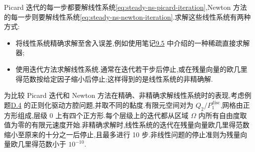 \begin{example}\label{ex:steady-ns-picard-vs-newton}
Picard 迭代的每一步都要解线性系统\cref{eq:steady-ns-picard-iteration},Newton 方法的每一步则要解线性系统\cref{eq:steady-ns-newton-iteration}.求解这些线性系统有两种方式:
\begin{itemize}
  \item 将线性系统精确求解至舍入误差,例如使用笔记\hyperref[note:ch09-sparse-direct-solvers]{9.5} 中介绍的一种稀疏直接求解器;
  \item 使用迭代方法求解线性系统.通常在迭代若干步后停止,或在残量向量的欧几里得范数按给定因子缩小后停止;这样得到的是线性系统的非精确解.
\end{itemize}

为比较 Picard 迭代和 Newton 方法在精确、非精确求解线性系统时的表现,考虑例题\hyperref[ex:appendix-d-4]{D.4} 的正则化驱动方腔问题,并取不同的黏度.有限元空间对为 $Q_2/P_1^{\mathrm{disc}}$,网格由正方形组成,层级 0 上有四个正方形.每个层级上的迭代都从区域 $\Omega$ 内所有自由度取值为零的有限元速度开始.非精确求解时,线性系统的迭代在残量向量欧几里得范数缩小至原来的十分之一后停止,且最多进行 10 步.非线性问题的停止准则为残量向量欧几里得范数小于 $10^{-10}$.


\end{example}
